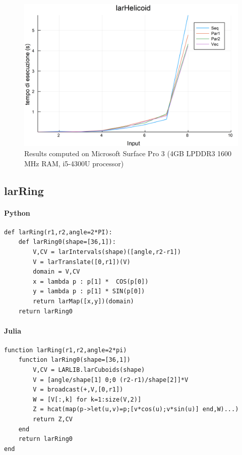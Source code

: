 \documentclass{article}
\begin{document}
\begin{figure}[htbp] 
\centering 
\includegraphics[scale=.13]{larHelicoidTime.png} 
\caption{Results computed on Microsoft Surface Pro  3 (4GB LPDDR3 1600 MHz RAM, i5-4300U processor)} 
\end{figure}
\subsection{larRing}

\paragraph{Python}

\begin{verbatim}
def larRing(r1,r2,angle=2*PI):
    def larRing0(shape=[36,1]):
        V,CV = larIntervals(shape)([angle,r2-r1])
        V = larTranslate([0,r1])(V)
        domain = V,CV
        x = lambda p : p[1] *  COS(p[0])
        y = lambda p : p[1] * SIN(p[0])
        return larMap([x,y])(domain)
    return larRing0	
\end{verbatim}

\paragraph{Julia}

\begin{verbatim}
function larRing(r1,r2,angle=2*pi)
    function larRing0(shape=[36,1])
        V,CV = LARLIB.larCuboids(shape)
        V = [angle/shape[1] 0;0 (r2-r1)/shape[2]]*V
        V = broadcast(+,V,[0,r1])
        W = [V[:,k] for k=1:size(V,2)]
        Z = hcat(map(p->let(u,v)=p;[v*cos(u);v*sin(u)] end,W)...)
        return Z,CV
    end
    return larRing0
end
\end{verbatim}
\end{document}
